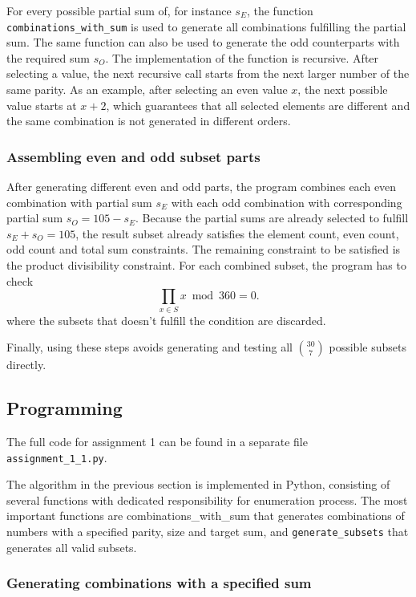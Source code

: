 \documentclass[11pt,a4paper]{article}
\begin{document}
For every possible partial sum of, for instance $s_E$, the function \texttt{combinations\_with\_sum} is used to generate all combinations fulfilling the partial sum. The same function can also be used to generate the odd counterparts with the required sum $s_O$. The implementation of the function is recursive. After selecting a value, the next recursive call starts from the next larger number of the same parity. As an example, after selecting an even value $x$, the next possible value starts at $x+2$, which guarantees that all selected elements are different and the same combination is not generated in different orders.

\subsubsection*{Assembling even and odd subset parts}

After generating different even and odd parts, the program combines each even combination with partial sum $s_E$ with each odd combination with corresponding partial sum $s_O = 105 - s_E$. Because the partial sums are already selected to fulfill $s_E + s_O = 105$, the result subset already satisfies the element count, even count, odd count and total sum constraints. The remaining constraint to be satisfied is the product divisibility constraint. For each combined subset, the program has to check
\[
\prod_{x\in S} x \bmod 360 = 0.
\]
where the subsets that doesn't fulfill the condition are discarded.

Finally, using these steps avoids generating and testing all $\binom{30}{7}$ possible subsets directly.

\subsection*{Programming}

The full code for assignment 1 can be found in a separate file \texttt{assignment\_1\_1.py}.

The algorithm in the previous section is implemented in Python, consisting of several functions with dedicated responsibility for enumeration process. The most important functions are {combinations\_with\_sum} that generates combinations of numbers with a specified parity, size and target sum, and \texttt{generate\_subsets} that generates all valid subsets.

\subsubsection*{Generating combinations with a specified sum}
\end{document}
